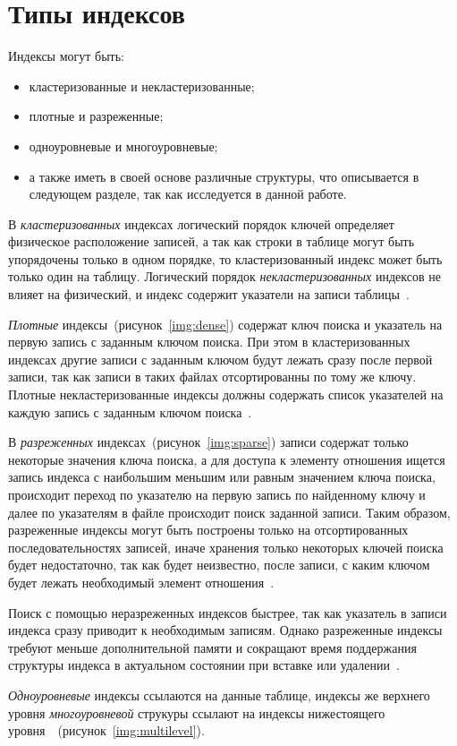 \section{Типы индексов}

Индексы могут быть:
\begin{itemize}
    \item кластеризованные и некластеризованные;
    \item плотные и разреженные;
    \item одноуровневые и многоуровневые;
    \item а также иметь в своей основе различные структуры, что описывается в
        следующем разделе, так как исследуется в данной работе.
\end{itemize}

 В \textit{кластеризованных} индексах логический порядок ключей определяет
 физическое расположение записей, а так как строки в таблице могут быть
 упорядочены только в одном порядке, то кластеризованный индекс может быть
 только один на таблицу. Логический порядок \textit{некластеризованных} индексов
 не влияет на физический, и индекс содержит указатели на записи
 таблицы~\cite{osip}.

\textit{Плотные} индексы~(рисунок~\ref{img:dense}) содержат ключ поиска и
указатель на первую запись с заданным ключом поиска. При этом в кластеризованных
индексах другие записи с заданным ключом будут лежать сразу после первой записи,
так как записи в таких файлах отсортированны по тому же ключу. Плотные
некластеризованные индексы должны содержать список указателей на каждую запись с
заданным ключом поиска~\cite{ship}.
 

В \textit{разреженных} индексах~(рисунок~\ref{img:sparse}) записи содержат
только некоторые значения ключа поиска, а для доступа к элементу отношения
ищется запись индекса с наибольшим меньшим или равным значением ключа поиска,
происходит переход по указателю на первую запись по найденному ключу и далее по
указателям в файле происходит поиск заданной записи. Таким образом, разреженные
индексы могут быть построены только на отсортированных последовательностях
записей, иначе хранения только некоторых ключей поиска будет недостаточно, так
как будет неизвестно, после записи, с каким ключом будет лежать необходимый
элемент отношения~\cite{ship}.


Поиск с помощью неразреженных индексов быстрее, так как указатель в записи
индекса сразу приводит к необходимым записям. Однако разреженные индексы требуют
меньше дополнительной памяти и сокращают время поддержания структуры индекса в
актуальном состоянии при вставке или удалении~\cite{ship}.

\textit{Одноуровневые} индексы ссылаются на данные таблице, индексы же верхнего уровня \textit{многоуровневой} струкуры ссылают на индексы нижестоящего
уровня~\cite{ship}~(рисунок~\ref{img:multilevel}).



